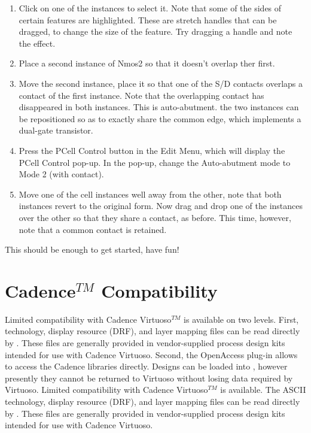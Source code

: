 \begin{enumerate}
\item{Click on one of the instances to select it.  Note that some of
the sides of certain features are highlighted.  These are stretch
handles that can be dragged, to change the size of the feature.  Try
dragging a handle and note the effect.}

\item{Place a second instance of {\vt Nmos2} so that it doesn't
overlap ther first.}

\item{Move the second instance, place it so that one of the S/D
contacts overlaps a contact of the first instance.  Note that the
overlapping contact has disappeared in both instances.  This is
auto-abutment.  the two instances can be repositioned so as to exactly
share the common edge, which implements a dual-gate transistor.}

\item{Press the {\cb PCell Control} button in the {\cb Edit Menu},
which will display the {\cb PCell Control} pop-up.  In the pop-up,
change the {\cb Auto-abutment mode} to {\cb Mode 2 (with contact)}.}

\item{Move one of the cell instances well away from the other, note
that both instances revert to the original form.  Now drag and drop
one of the instances over the other so that they share a contact, as
before.  This time, however, note that a common contact is retained.}
\end{enumerate}

This should be enough to get started, have fun!
\fi


\section{Cadence$^{TM}$ Compatibility}
\label{cdscompat}

\ifoa
Limited compatibility with Cadence Virtuoso$^{TM}$ is available on two
levels.  First, technology, display resource (DRF), and layer mapping
files can be read directly by {\Xic}.  These files are generally
provided in vendor-supplied process design kits intended for use with
Cadence Virtuoso.  Second, the OpenAccess plug-in allows {\Xic} to
access the Cadence libraries directly.  Designs can be loaded into
{\Xic}, however presently they cannot be returned to Virtuoso without
losing data required by Virtuoso.
\else
Limited compatibility with Cadence Virtuoso$^{TM}$ is available.  The
ASCII technology, display resource (DRF), and layer mapping files can
be read directly by {\Xic}.  These files are generally provided in
vendor-supplied process design kits intended for use with Cadence
Virtuoso.
\fi


